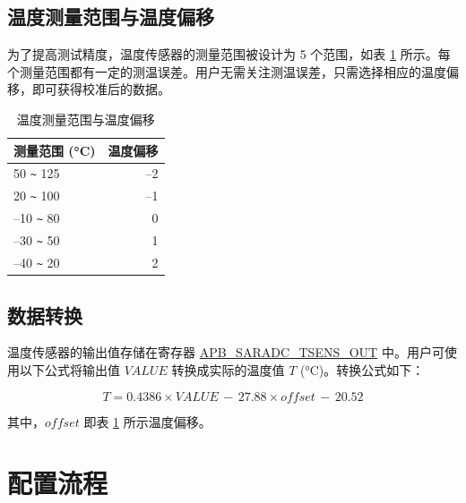 \documentclass[main\_\_CN.tex]{subfiles}
\begin{document}
\subsection{温度测量范围与温度偏移}

为了提高测试精度，温度传感器的测量范围被设计为 5 个范围，如表 \ref{tab:tmpsen-dac} 所示。每个测量范围都有一定的测温误差。用户无需关注测温误差，只需选择相应的温度偏移，即可获得校准后的数据。
\begin{longtable}[c]{|l|r|}
    \caption{温度测量范围与温度偏移}
    \label{tab:tmpsen-dac}
    \\\hline
    \rowcolor{lightgray}
    测量范围 (°C)  & 温度偏移 \\\hline
    50 \verb+~+ 125 & –2 \\\hline
    20 \verb+~+ 100 &  –1 \\\hline
    –10 \verb+~+ 80 &  0 \\\hline
    –30 \verb+~+ 50 &  1 \\\hline
    –40 \verb+~+ 20 &  2 \\\hline
\end{longtable}

\subsection{数据转换}

温度传感器的输出值存储在寄存器 \hyperref[fielddesc:APBSARADCTSENSOUT]{APB\_SARADC\_TSENS\_OUT} 中。用户可使用以下公式将输出值 \(VALUE\) 转换成实际的温度值 \(T\) (°C)。转换公式如下：

\[
        T = 0.4386 \times VALUE \,-\, 27.88 \times offset \,-\, 20.52
\]

其中，\(offset\) 即表 \ref{tab:tmpsen-dac} 所示温度偏移。

\section{配置流程}
\end{document}
